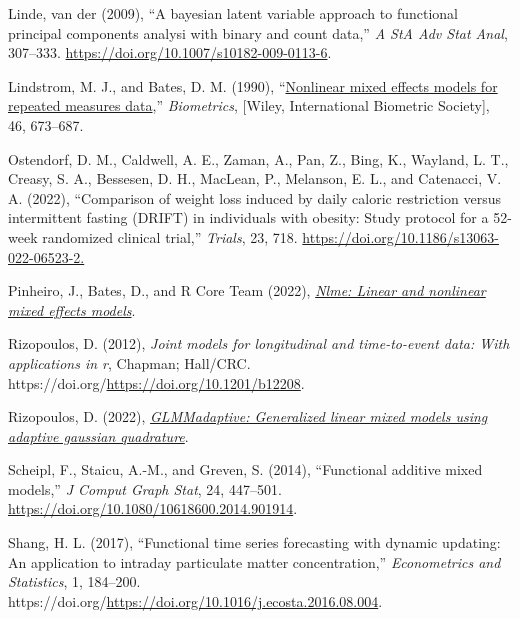 \documentclass[
  11pt,
]{article}
\newlength{\cslhangindent}
\newlength{\cslentryspacingunit} %
\newenvironment{CSLReferences}[2] %
 {%
  \setlength{\parindent}{0pt}
  \ifodd #1
  \let\oldpar\par
  \def\par{\hangindent=\cslhangindent\oldpar}
  \fi
  \setlength{\parskip}{#2\cslentryspacingunit}
 }%
 {}
\begin{document}
\begin{CSLReferences}{1}{0}
\leavevmode{}%
Linde, van der (2009), {``A bayesian latent variable approach to
functional principal components analysi with binary and count data,''}
\emph{A StA Adv Stat Anal}, 307--333.
\url{https://doi.org/10.1007/s10182-009-0113-6}.

\leavevmode{}%
Lindstrom, M. J., and Bates, D. M. (1990),
{``\href{http://www.jstor.org/stable/2532087}{Nonlinear mixed effects
models for repeated measures data},''} \emph{Biometrics}, {[}Wiley,
International Biometric Society{]}, 46, 673--687.

\leavevmode{}%
Ostendorf, D. M., Caldwell, A. E., Zaman, A., Pan, Z., Bing, K.,
Wayland, L. T., Creasy, S. A., Bessesen, D. H., MacLean, P., Melanson,
E. L., and Catenacci, V. A. (2022), {``Comparison of weight loss induced
by daily caloric restriction versus intermittent fasting (DRIFT) in
individuals with obesity: Study protocol for a 52-week randomized
clinical trial,''} \emph{Trials}, 23, 718.
\url{https://doi.org/10.1186/s13063-022-06523-2.}

\leavevmode{}%
Pinheiro, J., Bates, D., and R Core Team (2022),
\emph{\href{https://CRAN.R-project.org/package=nlme}{Nlme: Linear and
nonlinear mixed effects models}}.

\leavevmode{}%
Rizopoulos, D. (2012), \emph{Joint models for longitudinal and
time-to-event data: With applications in r}, Chapman; Hall/CRC.
https://doi.org/\url{https://doi.org/10.1201/b12208}.

\leavevmode{}%
Rizopoulos, D. (2022),
\emph{\href{https://CRAN.R-project.org/package=GLMMadaptive}{GLMMadaptive:
Generalized linear mixed models using adaptive gaussian quadrature}}.

\leavevmode{}%
Scheipl, F., Staicu, A.-M., and Greven, S. (2014), {``Functional
additive mixed models,''} \emph{J Comput Graph Stat}, 24, 447--501.
\url{https://doi.org/10.1080/10618600.2014.901914}.

\leavevmode{}%
Shang, H. L. (2017), {``Functional time series forecasting with dynamic
updating: An application to intraday particulate matter
concentration,''} \emph{Econometrics and Statistics}, 1, 184--200.
https://doi.org/\url{https://doi.org/10.1016/j.ecosta.2016.08.004}.


\end{CSLReferences}
\end{document}
